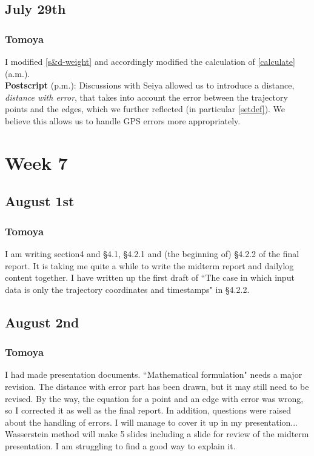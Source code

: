 \documentclass{article}
\numberwithin{equation}{section}
\theoremstyle{definition}
\begin{document}
\subsection{July 29th}
\subsubsection*{Tomoya}
I modified \autoref{s&d-weight} and accordingly modified the calculation of \autoref{calculate} (a.m.). \\
\textbf{Postscript} (p.m.):
Discussions with Seiya allowed us to introduce a distance, \emph{distance with error}, that takes into account the error between the trajectory points and the edges, which we further reflected (in particular \autoref{setdef}).
We believe this allows us to handle GPS errors more appropriately.

\section{Week 7}
\subsection{August 1st}
\subsubsection*{Tomoya}

I am writing section4 and \S 4.1, \S 4.2.1 and (the beginning of) \S 4.2.2 of the final report.
It is taking me quite a while to write the midterm report and dailylog content together.
I have written up the first draft of ``The case in which input data is only the trajectory coordinates and timestamps" in \S 4.2.2.

\subsection{August 2nd}
\subsubsection*{Tomoya}

I had made presentation documents.
``Mathematical formulation" needs a major revision.
The distance with error part has been drawn, but it may still need to be revised.
By the way, the equation for a point and an edge with error was wrong, so I corrected it as well as the final report.
In addition, questions were raised about the handling of errors.
I will manage to cover it up in my presentation...
Wasserstein method will make 5 slides including a slide for review of the midterm presentation.
I am struggling to find a good way to explain it.
\end{document}
